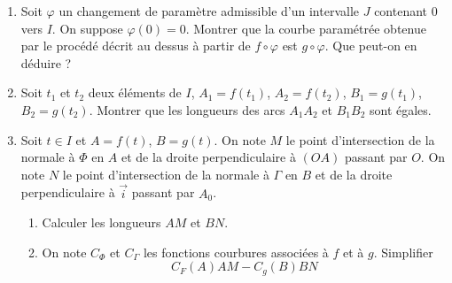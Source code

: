 \begin{enumerate}
\item Soit $\varphi$ un changement de paramètre admissible d'un intervalle $J$ contenant 0 vers $I$. On suppose $\varphi(0)=0$. Montrer que la courbe paramétrée obtenue par le procédé décrit au dessus à partir de $f\circ \varphi$ est $g\circ \varphi$. Que peut-on en déduire ?
\item Soit $t_1$ et $t_2$ deux éléments de $I$, $A_1=f(t_1)$, $A_2=f(t_2)$, $B_1=g(t_1)$, $B_2=g(t_2)$. Montrer que les longueurs des arcs $A_1A_2$ et $B_1B_2$ sont égales.
\item Soit $t \in I$ et $A=f(t)$, $B=g(t)$.\newline
On note $M$ le point d'intersection de la normale à $\Phi$ en $A$ et de la droite perpendiculaire à $(OA)$ passant par $O$.\newline
On note $N$ le point d'intersection de la normale à $\Gamma$ en $B$ et de la droite perpendiculaire à $\overrightarrow{i}$ passant par $A_0$.
\begin{enumerate}
\item  Calculer les longueurs $AM$ et $BN$.
\item On note $C_\Phi$ et $C_\Gamma$ les fonctions courbures associées à $f$ et à $g$. Simplifier
\[C_F(A)AM - C_g(B)BN\]
\end{enumerate}


\end{enumerate}
